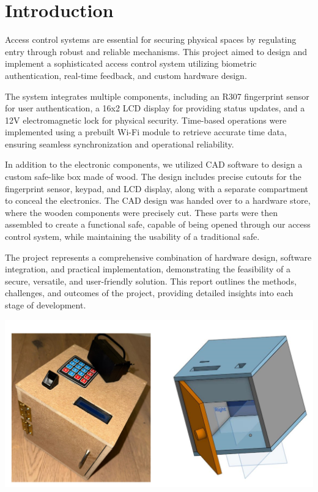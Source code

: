 \documentclass{article}
\begin{document}
\tableofcontents

\newpage 



\newpage
\section{Introduction}
Access control systems are essential for securing physical spaces by regulating entry through robust and reliable mechanisms. This project aimed to design and implement a sophisticated access control system utilizing biometric authentication, real-time feedback, and custom hardware design.

The system integrates multiple components, including an R307 fingerprint sensor for user authentication, a 16x2 LCD display for providing status updates, and a 12V electromagnetic lock for physical security. Time-based operations were implemented using a prebuilt Wi-Fi module to retrieve accurate time data, ensuring seamless synchronization and operational reliability.

In addition to the electronic components, we utilized CAD software to design a custom safe-like box made of wood. The design includes precise cutouts for the fingerprint sensor, keypad, and LCD display, along with a separate compartment to conceal the electronics. The CAD design was handed over to a hardware store, where the wooden components were precisely cut. These parts were then assembled to create a functional safe, capable of being opened through our access control system, while maintaining the usability of a traditional safe.

The project represents a comprehensive combination of hardware design, software integration, and practical implementation, demonstrating the feasibility of a secure, versatile, and user-friendly solution. This report outlines the methods, challenges, and outcomes of the project, providing detailed insights into each stage of development.



\begin{center}
    \includegraphics[width=\linewidth]{images/testpicture5.png}
    \captionsetup{hypcap=false}
    \captionsetup{hypcap=true} 
\end{center}
\end{document}
